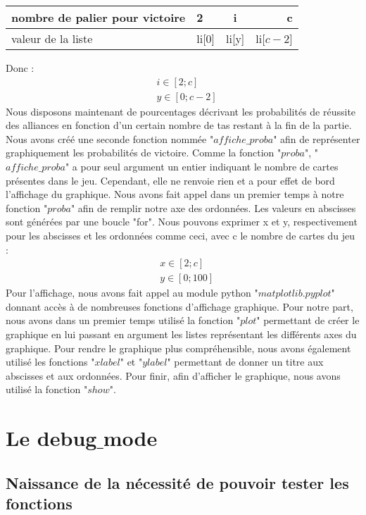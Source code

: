 \documentclass[10pt,a4paper,french,titlepage]{article}
\begin{document}
\begin{center}
\begin{tabular}{|p{3cm}|l|c|r|}
  \hline
  nombre de palier pour victoire & 2 & i & c\\
  \hline
  valeur de la liste & li[0] & li[y] & li[$c-2$] \\
  \hline
\end{tabular}
\end{center}
Donc :
\begin{align*}
&i \in [2;c]\\
&y \in [0;c-2]
\end{align*}
Nous disposons maintenant de pourcentages décrivant les probabilités de réussite des alliances en fonction d'un certain nombre de tas restant à la fin 
de la partie. Nous avons créé une seconde fonction nommée "$affiche\_proba$" afin de représenter graphiquement les probabilités de victoire. Comme la fonction "$proba$",
"$affiche\_proba$" a pour seul argument un entier indiquant le nombre de cartes présentes dans le jeu. Cependant, elle ne renvoie rien et a pour effet de bord l'affichage
du graphique. Nous avons fait appel dans un premier temps à notre fonction "$proba$" afin de remplir notre axe des ordonnées. Les valeurs en abscisses sont générées par une boucle
"for". Nous pouvons exprimer x et y, respectivement pour les abscisses et les ordonnées comme ceci, avec c le nombre de cartes du jeu :
\begin{align*}
&x \in [2;c] \\
&y \in [0;100]
\end{align*}
Pour l'affichage, nous avons fait appel au module python "$matplotlib.pyplot$" donnant accès à de nombreuses fonctions d'affichage graphique. Pour notre part, nous avons
dans un premier temps utilisé la fonction "$plot$" permettant de créer le graphique en lui passant en argument les listes représentant les différents axes du graphique.
Pour rendre le graphique plus compréhensible, nous avons également utilisé les fonctions "$xlabel$" et "$ylabel$" permettant de donner un titre aux abscisses et aux
ordonnées. Pour finir, afin d'afficher le graphique, nous avons utilisé la fonction "$show$".



\section{Le debug$\_$mode}
\subsection{Naissance de la nécessité de pouvoir tester les fonctions}
\end{document}
